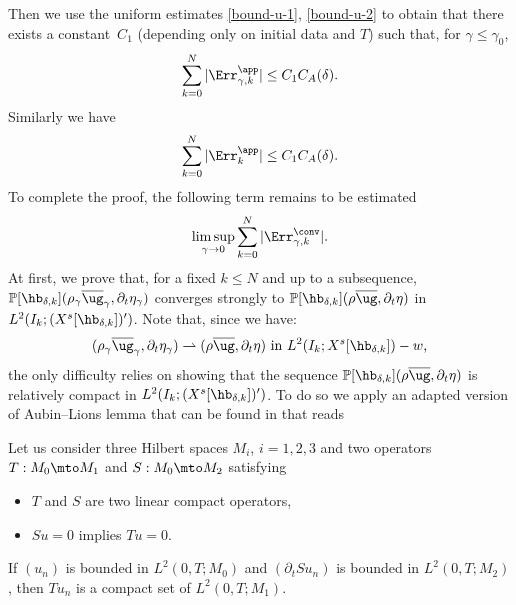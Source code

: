 Then we use the uniform estimates \eqref{bound-u-1}, \eqref{bound-u-2} to obtain that there exists a constant~$C_1$
(depending only on initial data and $T$) such that, for $\gamma \leq \gamma_0$,
\begin{equation} \label{eq_Err1}
\sum_{k=0}^N |\Err_{\gamma,k}^{\app}| \leq C_1 C_A(\delta).
\end{equation}
Similarly we have
\begin{equation} \label{eq_Err2}
\sum_{k=0}^N |\Err_{k}^{\app}| \leq C_1 C_A(\delta).
\end{equation}
To complete the proof, the following term remains to be estimated
\[
\limsup_{\gamma \to 0} \sum_{k=0}^N |\Err_{\gamma,k}^{\conv}|.
\]
At first, we prove that, for a fixed $k \leq N$ and up to a subsequence, $\mathbb{P}[\hb_{\delta, k}](\rho_{\gamma}\overline{\ug}_{\gamma},\partial_{t}\eta_{\gamma})$ converges strongly to $\mathbb{P}[\hb_{\delta, k}](\rho\overline{\ug},\partial_{t}\eta)$ in $L^{2}(I_{k};(X^{s}[\hb_{\delta, k}])')$. Note that, since we have:
\[
(\rho_{\gamma}\overline{\ug}_{\gamma},\partial_t \eta_{\gamma}) \rightharpoonup (\rho \overline{\ug},\partial_t \eta) \text{ in $L^2(I_k;X^s[\hb_{\delta, k}])-w$,}
\]
the only difficulty relies on showing that the sequence $\mathbb{P}[\hb_{\delta, k}](\rho\overline{\ug},\partial_{t}\eta)$ is relatively compact in $L^{2}(I_{k};(X^{s}[\hb_{\delta, k}])')$.
To do so we apply an adapted version of Aubin--Lions lemma that can be found in \cite[\S 4.3]{Fujita-Sauer} that reads
\begin{lemma} Let us consider three Hilbert spaces $M_i$, $i=1, 2,3 $ and two operators $T : M_0 \mto M_1$ and $S : M_0 \mto M_2$ satisfying
\begin{itemize}
\item $T$ and $S$ are two linear compact operators,
\item $Su=0$ implies $Tu=0$.
\end{itemize}
If $(u_n)$ is bounded in $L^2(0, T; M_0)$ and $(\partial_t S u_n)$ is bounded in $L^2(0, T; M_2)$, then $T u_n$ is a compact set of $L^2(0, T; M_1)$.
\end{lemma}

